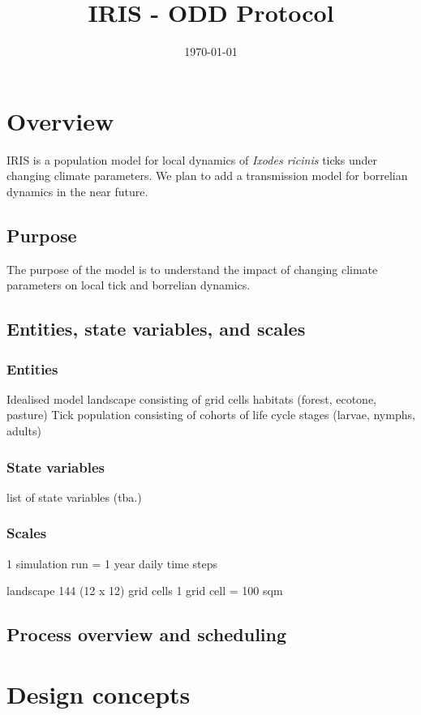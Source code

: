 \documentclass[a4paper, 11pt]{article}
\title{IRIS - ODD Protocol}
\author{}
\date{\today}
\begin{document}
	
\maketitle
\tableofcontents

\section{Overview}
IRIS is a population model for local dynamics of \textit{Ixodes ricinis} ticks under changing climate parameters.
We plan to add a transmission model for borrelian dynamics in the near future.


\subsection{Purpose}
The purpose of the model is to understand the impact of changing climate parameters on local tick and borrelian dynamics. 


\subsection{Entities, state variables, and scales}

\subsubsection{Entities}
Idealised model landscape consisting of grid cells 
habitats (forest, ecotone, pasture)
Tick population consisting of cohorts of life cycle stages (larvae, nymphs, adults)


\subsubsection{State variables}

list of state variables (tba.)


\subsubsection{Scales}
1 simulation run = 1 year 
daily time steps

landscape 144 (12 x 12) grid cells
1 grid cell = 100 sqm 


\subsection{Process overview and scheduling}

\section{Design concepts}
\end{document}
